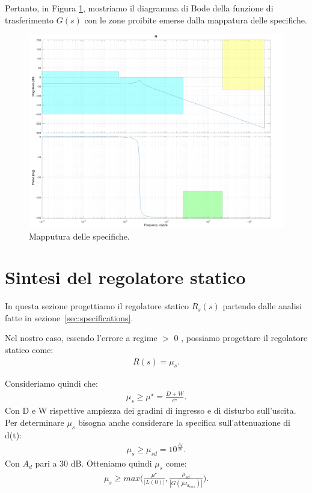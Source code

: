 \documentclass[a4paper, 11pt]{article}
\begin{document}
Pertanto, in Figura \ref{fig:G_bode_specifiche}, mostriamo il diagramma di Bode della funzione di trasferimento $G(s)$ con le zone proibite emerse dalla mappatura delle specifiche.
\begin{figure}[h!]
	\centering
	\includegraphics[width=0.75\linewidth]{./images/bode_G_mappatura.png}
	\caption{Mapputura delle specifiche.}
	\label{fig:G_bode_specifiche}
\end{figure}

\section{Sintesi del regolatore statico}
\label{sec:static_regulator}

In questa sezione progettiamo il regolatore statico $R_s(s)$ partendo dalle analisi fatte in sezione~\ref{sec:specifications}.

Nel nostro caso, essendo l'errore a regime $>$ 0 , possiamo progettare il regolatore statico come:
\begin{align}
	R(s) = \mu_s.
\end{align}

Consideriamo quindi che:
\begin{align}
	\mu_s \geq \mu^{\star} = \frac{D+W}{e^{\star}}.
\end{align}
Con D e W rispettive ampiezza dei gradini di ingresso e di disturbo sull'uscita.\\
Per determinare $\mu_s$ bisogna anche considerare la specifica sull'attenuazione di d(t):
\begin{align}
	\mu_s \geq \mu_{sd} = 10^{\frac{A_d}{20}}.
\end{align}
Con $A_d$ pari a 30 dB. Otteniamo quindi $\mu_s$ come:
\begin{align}
	\mu_s \geq max\bigg(\frac{\mu^{\star}}{\left| L(0)\right|}, \frac{\mu_{sd}}{\left| G(j\omega_{d_{max}})\right|}\bigg).
\end{align}
\end{document}
